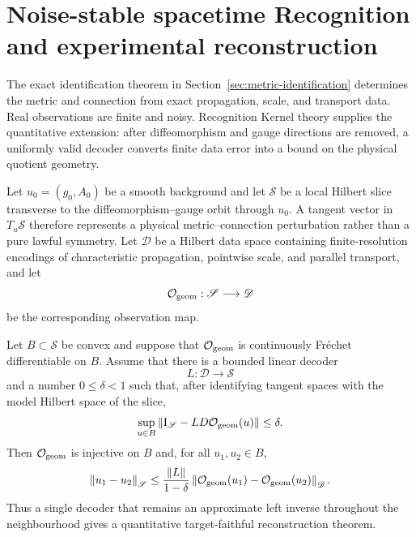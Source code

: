 \section{Noise-stable spacetime Recognition and experimental reconstruction}
\label{sec:noise-stable-spacetime}

The exact identification theorem in Section~\ref{sec:metric-identification} determines the metric and connection from exact propagation, scale, and transport data.  Real observations are finite and noisy.  Recognition Kernel theory supplies the quantitative extension: after diffeomorphism and gauge directions are removed, a uniformly valid decoder converts finite data error into a bound on the physical quotient geometry.

Let $u_0=(g_0,A_0)$ be a smooth background and let $\mathscr S$ be a local Hilbert slice transverse to the diffeomorphism--gauge orbit through $u_0$.  A tangent vector in $T_u\mathscr S$ therefore represents a physical metric--connection perturbation rather than a pure lawful symmetry.  Let $\mathscr D$ be a Hilbert data space containing finite-resolution encodings of characteristic propagation, pointwise scale, and parallel transport, and let
\[
\mathcal O_{\mathrm{geom}}:\mathscr S\longrightarrow\mathscr D
\]
be the corresponding observation map.

\begin{theorem}
\label{thm:fixed-decoder-spacetime}
Let $B\subset\mathscr S$ be convex and suppose that $\mathcal O_{\mathrm{geom}}$ is continuously Fr\'{e}chet differentiable on $B$.  Assume that there is a bounded linear decoder
\[
L:\mathscr D\longrightarrow\mathscr S
\]
and a number $0\le\delta<1$ such that, after identifying tangent spaces with the model Hilbert space of the slice,
\begin{equation}
\sup_{u\in B}
\left\lVert\mathrm I_{\mathscr S}-L D\mathcal O_{\mathrm{geom}}(u)\right\rVert
\le\delta.
\label{eq:uniform-decoder-defect}
\end{equation}
Then $\mathcal O_{\mathrm{geom}}$ is injective on $B$ and, for all $u_1,u_2\in B$,
\begin{equation}
\left\lVert u_1-u_2\right\rVert_{\mathscr S}
\le
\frac{\left\lVert L\right\rVert}{1-\delta}
\left\lVert\mathcal O_{\mathrm{geom}}(u_1)-\mathcal O_{\mathrm{geom}}(u_2)\right\rVert_{\mathscr D}.
\label{eq:fixed-decoder-stability}
\end{equation}
Thus a single decoder that remains an approximate left inverse throughout the neighbourhood gives a quantitative target-faithful reconstruction theorem.
\end{theorem}


